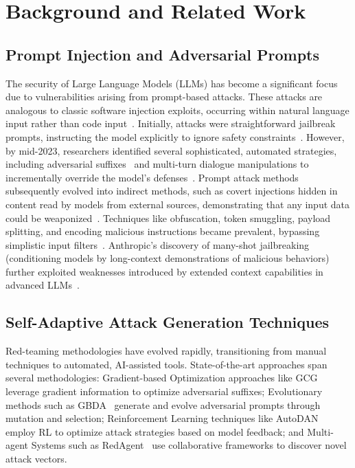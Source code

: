 \section{Background and Related Work}

\subsection{Prompt Injection and Adversarial Prompts}

The security of Large Language Models (LLMs) has become a significant focus due to vulnerabilities arising from prompt-based attacks. These attacks are analogous to classic software injection exploits, occurring within natural language input rather than code input~\cite{arthur2024promptinjection, lakera2024promptguide}. Initially, attacks were straightforward jailbreak prompts, instructing the model explicitly to ignore safety constraints~\cite{arthur2024promptinjection}. However, by mid-2023, researchers identified several sophisticated, automated strategies, including adversarial suffixes~\cite{zou2023universal} and multi-turn dialogue manipulations to incrementally override the model's defenses~\cite{zou2024oneshot}. Prompt attack methods subsequently evolved into indirect methods, such as covert injections hidden in content read by models from external sources, demonstrating that any input data could be weaponized~\cite{lakera2024promptguide, venturebeat2024prompt}. Techniques like obfuscation, token smuggling, payload splitting, and encoding malicious instructions became prevalent, bypassing simplistic input filters~\cite{learnprompting2024obfuscation}. Anthropic's discovery of many-shot jailbreaking (conditioning models by long-context demonstrations of malicious behaviors) further exploited weaknesses introduced by extended context capabilities in advanced LLMs~\cite{anthropic2024manyshot}.

\subsection{Self-Adaptive Attack Generation Techniques}

Red-teaming methodologies have evolved rapidly, transitioning from manual techniques to automated, AI-assisted tools. State-of-the-art approaches span several methodologies: Gradient-based Optimization approaches like GCG~\cite{zou2023universal} leverage gradient information to optimize adversarial suffixes; Evolutionary methods such as GBDA~\cite{guo2021gradient} generate and evolve adversarial prompts through mutation and selection; Reinforcement Learning techniques like AutoDAN~\cite{liu2023autodan} employ RL to optimize attack strategies based on model feedback; and Multi-agent Systems such as RedAgent~\cite{xu2024redagent} use collaborative frameworks to discover novel attack vectors.

